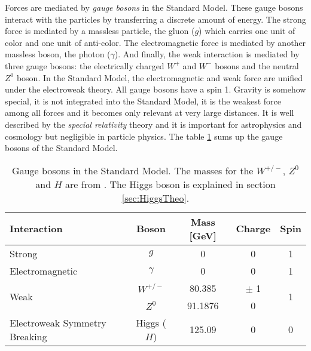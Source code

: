 Forces are mediated by \textit{gauge bosons} in the Standard Model. These gauge bosons interact with the particles by transferring a discrete amount of energy. The strong force is mediated by a massless particle, the gluon ($g$) which carries one unit of color and one unit of anti-color. The electromagnetic force is mediated by another massless boson, the photon ($\gamma$). And finally, the weak interaction is mediated by three gauge bosons: the electrically charged $W^+$ and $W^-$ bosons and the neutral $Z^0$ boson. In the Standard Model, the electromagnetic and weak force are unified under the electroweak theory. All gauge bosons have a spin 1. Gravity is somehow special, it is not integrated into the Standard Model, it is the weakest force among all forces and it becomes only relevant at very large distances. It is well described by the \textit{special relativity} theory \cite{Einstein:1905ve} and it is important for astrophysics and cosmology but negligible in particle physics. The table \ref{table:GaugeBosons} sums up the gauge bosons of the Standard Model.

\begin{table}[htb!]
  \centering
  \caption{Gauge bosons in the Standard Model. The masses for the $W^{+/-}$, $Z^0$ and $H$ are from \cite{Patrignani:2016xqp}. The Higgs boson is explained in section \ref{sec:HiggsTheo}.}
  \label{table:GaugeBosons}
  \begin{tabular}{|p{8cm}||cccc|}
    \hline
    Interaction & Boson & Mass [GeV] & Charge & Spin\\
    \hline
    Strong & $g$ & 0 & 0 & 1\\
    \hline
    Electromagnetic & $\gamma$ & 0 & 0 & 1\\
    \hline
    \multirow{2}{*}{Weak} & $W^{+/-}$ & 80.385 & $\pm$ 1 & \multirow{2}{*}{1}\\
    & $Z^0$ & 91.1876 & 0 &\\
    \hline
    \hline
    Electroweak Symmetry Breaking & Higgs ($H$) & 125.09 & 0 & 0\\
    \hline
  \end{tabular}
\end{table}

